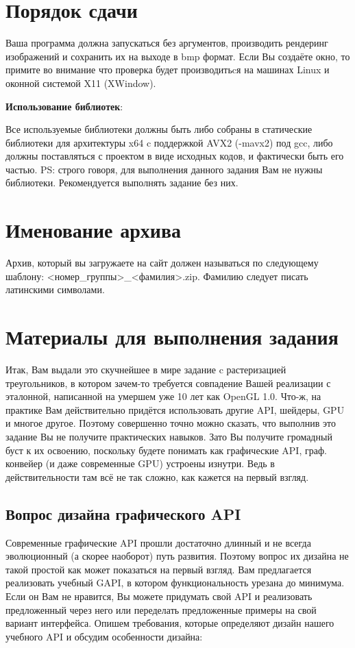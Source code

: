 \documentclass[12pt,subf,href,colorlinks=true]{article}
\begin{document}
\section{Порядок сдачи}
Ваша программа должна запускаться без аргументов, производить рендеринг изображений и сохранить их на выходе в bmp формат. Если Вы создаёте окно, то примите во внимание что проверка будет производитьcя на машинах Linux и оконной системой X11 (XWindow).
 
\noindent\textbf{Использование библиотек}: 

Все используемые библиотеки должны быть либо собраны в статические библиотеки для архитектуры x64 c поддержкой AVX2 (-mavx2) под gcc, либо должны поставляться с проектом в виде исходных кодов, и фактически быть его частью. PS: строго говоря, для выполнения данного задания Вам не нужны библиотеки. Рекомендуется выполнять задание без них. 

\section{Именование архива}

Архив, который вы загружаете на сайт должен называться по следующему шаблону: \newline <номер\_группы>\_<фамилия>.zip. Фамилию следует писать латинскими символами.

\section{Материалы для выполнения задания}\label{materials}

Итак, Вам выдали это скучнейшее в мире задание c растеризацией треугольников, в котором зачем-то требуется совпадение Вашей реализации с эталонной, написанной на умершем уже 10 лет как OpenGL 1.0. Что-ж, на практике Вам действительно придётся использовать другие API, шейдеры, GPU и многое другое. Поэтому совершенно точно можно сказать, что выполнив это задание Вы не получите практических навыков. Зато Вы получите громадный буст к их освоению, поскольку будете понимать как графические API, граф. конвейер (и даже современные GPU) устроены изнутри. Ведь в действительности там всё не так сложно, как кажется на первый взгляд.

\subsection{Вопрос дизайна графического API}

Современные графические API прошли достаточно длинный и не всегда эволюционный (а скорее наоборот) путь развития. Поэтому вопрос их дизайна не такой простой как может показаться на первый взгляд. Вам предлагается реализовать учебный GAPI, в котором функциональность урезана до минимума. Если он Вам не нравится, Вы можете придумать свой API и реализовать предложенный через него или переделать предложенные примеры на свой вариант интерфейса. Опишем требования, которые определяют дизайн нашего учебного API и обсудим особенности дизайна:
\end{document}

